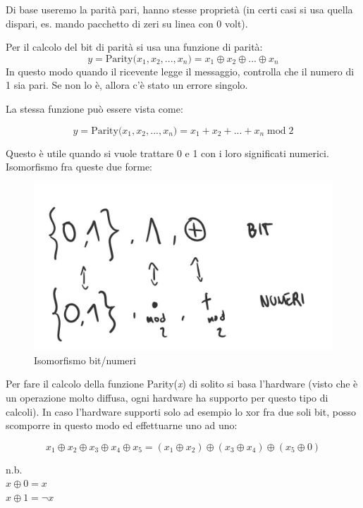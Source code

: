 Di base useremo la parità pari, hanno stesse proprietà (in certi casi si usa quella dispari, es. mando pacchetto di zeri su linea con 0 volt).

Per il calcolo del bit di parità si usa una funzione di parità:
\begin{equation}
y = \textrm{Parity(}x_1, x_2, ..., x_n\textrm{)} = x_1 \oplus x_2 \oplus ... \oplus x_n
\end{equation}
In questo modo quando il ricevente legge il messaggio, controlla che il numero di 1 sia pari.
Se non lo è, allora c'è stato un errore singolo.

La stessa funzione può essere vista come:

\begin{equation}
y = \textrm{Parity(}x_1, x_2, ..., x_n\textrm{)} = x_1 + x_2 + ... + x_n \; \text{mod} \; 2
\end{equation}

Questo è utile quando si vuole trattare 0 e 1 con i loro significati numerici.
Isomorfismo fra queste due forme:

\begin{figure}[h]
	\centering
	\includegraphics[width=0.6\linewidth]{immagini/img2}
	\caption{Isomorfismo bit/numeri}
\end{figure}

Per fare il calcolo della funzione Parity(\textit{x}) di solito si basa l'hardware (visto che è un operazione molto diffusa, ogni hardware ha supporto per questo tipo di calcoli).
In caso l'hardware supporti solo ad esempio lo xor fra due soli bit, posso scomporre in questo modo ed effettuarne uno ad uno:

\begin{equation}
x_1 \oplus x_2 \oplus x_3 \oplus x_4 \oplus x_5 = (x_1 \oplus x_2) \oplus (x_3\oplus x_4) \oplus (x_5 \oplus 0)
\end{equation}
\begin{center}
n.b.\\
$x \oplus 0 = x$\\
$x \oplus 1 = \lnot x$
\end{center}


